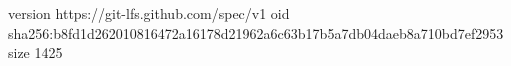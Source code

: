 version https://git-lfs.github.com/spec/v1
oid sha256:b8fd1d262010816472a16178d21962a6c63b17b5a7db04daeb8a710bd7ef2953
size 1425
